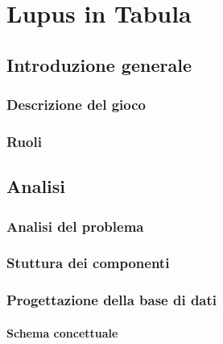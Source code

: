\documentclass[10pt,twoside,cucitura]{toptesi}
\begin{document}
\frontespizio

\sommario


\indici

\mainmatter

\part{Lupus in Tabula}


\chapter{Introduzione generale}

\section{Descrizione del gioco}


\section{Ruoli}


\chapter{Analisi}

\section{Analisi del problema}


\section{Stuttura dei componenti}


\section{Progettazione della base di dati}


\subsection{Schema concettuale}

\end{document}
